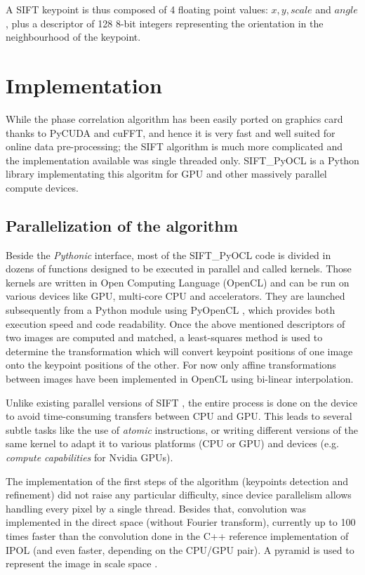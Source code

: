 \documentclass[preprint]{iucr}
\begin{document}
A SIFT keypoint is thus composed of 4 floating point values: $x, y, scale$ and
$angle$, plus a descriptor of 128 8-bit integers representing the
orientation in the neighbourhood of the keypoint.

\section{Implementation}
While the phase correlation algorithm has been easily ported on graphics card
thanks to PyCUDA \cite{pyopencl} and cuFFT, and hence it is very fast and well
suited for online data pre-processing;
the SIFT algorithm is much more complicated and the implementation available
\cite{ASIFT} was single threaded only. SIFT\_PyOCL is a Python library
implementating this algoritm for GPU and other massively parallel compute
devices.


\subsection{Parallelization of the algorithm}
Beside the \emph{Pythonic} interface, most of the  
SIFT\_PyOCL code is divided in dozens of functions designed to be
executed in parallel and called kernels. Those kernels are written in Open
Computing Language (OpenCL) \cite{opencl} and  can be run on various
devices like GPU, multi-core CPU and accelerators. 
They are launched subsequently from a Python module using PyOpenCL
\cite{pyopencl}, which provides both execution speed and code readability. 
Once the above mentioned descriptors of two images are computed and matched, a
least-squares method is used to determine the transformation which will convert
keypoint positions of one image onto the keypoint positions of the other. For
now only affine transformations between images have been implemented in OpenCL
using bi-linear interpolation. 

Unlike existing parallel versions of SIFT \cite{lu,rister,vasilyev}, the entire
process is done on the device to avoid time-consuming transfers between CPU and
GPU. 
This leads to several subtle tasks like the use of \emph{atomic} instructions,
or writing different versions of the same kernel to adapt it to various
platforms (CPU or GPU) and devices (e.g. \emph{compute capabilities} for
Nvidia GPUs).

The implementation of the first steps of the algorithm (keypoints detection and
refinement) did not raise any particular difficulty, since device parallelism 
allows handling every pixel by a single thread.
Besides that, convolution was implemented in the direct space (without Fourier
transform), currently up to 100 times faster than the convolution done in 
the C++ reference implementation of IPOL \cite{ASIFT} 
(and even faster, depending on the CPU/GPU pair).  
A pyramid is used to represent the image in scale space \cite{Lowe04}.
\end{document}
